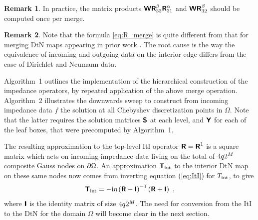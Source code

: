 \documentclass[11pt,final]{amsart}
\theoremstyle{definition}
\newtheorem{remark}{Remark}
\numberwithin{remark}{section}
\numberwithin{definition}{section}
\numberwithin{pro}{section}
\begin{document}

\begin{remark}
In practice, the matrix products $\bm{\mathsf{W}}\bm{\mathsf{R}}^\beta_{33}\bm{\mathsf{R}}^\alpha_{31}$ and $\bm{\mathsf{W}}\bm{\mathsf{R}}^\beta_{32}$
should be computed once per merge.
\end{remark}

\begin{remark}
Note that the formula \eqref{eq:R_merge} is quite different from that for
merging DtN maps appearing in prior work \cite{ONspectralcomposite,2012_martinsson_spectralcomposite}.
The root cause is the way the equivalence of
incoming and outgoing data on the interior edge differs from the case
of Dirichlet and Neumann data.
\end{remark}

Algorithm~1 outlines the implementation of the hierarchical construction of the
impedance operators, by repeated application of the above merge operation.
Algorithm~2 illustrates the downwards sweep to construct
from incoming impedance data $f$
the solution at all Chebyshev discretization points in $\Omega$.
Note that the latter requires the solution matrices $\bm{\mathsf{S}}$ at each level,
and $\bm{\mathsf{Y}}$ for each of the leaf boxes, that were precomputed by Algorithm~1.

The resulting approximation to the top-level ItI operator
$\bm{\mathsf{R}} = \bm{\mathsf{R}}^1$ is a square matrix which acts on incoming impedance
data living on the total of $4q 2^M$ composite Gauss nodes on ${\partial\Omega}$.
An approximation $\bm{\mathsf{T}}_{\rm int}$ to the interior DtN map
on these same nodes
now comes from inverting equation (\ref{eq:ItI}) for $T_{\rm int}$, to give
\begin{equation}
\bm{\mathsf{T}}_{\rm int} = -{\rm i}\eta\left(\bm{\mathsf{R}}-\bm{\mathsf{I}}\right)^{-1}\left(\bm{\mathsf{R}}+\bm{\mathsf{I}}\right)
~,
\label{eq:getTback}
\end{equation}
where $\bm{\mathsf{I}}$ is the identity matrix of size $4q 2^M$.
The need for conversion from the ItI to the DtN for the domain $\Omega$ will become
clear in the next section.
\end{document}
